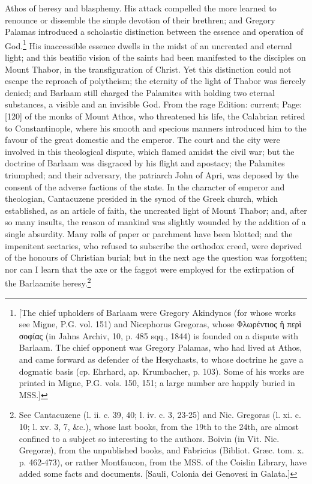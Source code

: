 Athos of heresy and blasphemy. His attack compelled the more learned to renounce or dissemble the simple devotion of their brethren; and Gregory Palamas introduced a scholastic distinction between the essence and operation of God.\footnote{[The chief upholders of Barlaam were Gregory Akindynos (for whose works see Migne, P.G. vol. 151) and Nicephorus Gregoras, whose \textgreek{Φλωρέντιος \texthebrew{ἢ} περ\texthebrew{ὶ} σοφίας} (in Jahns Archiv, 10, p. 485 sqq., 1844) is founded on a dispute with Barlaam. The chief opponent was Gregory Palamas, who had lived at Athos, and came forward as defender of the Hesychasts, to whose doctrine he gave a dogmatic basis (cp. Ehrhard, ap. Krumbacher, p. 103). Some of his works are printed in Migne, P.G. vols. 150, 151; a large number are happily buried in MSS.]} His inaccessible essence dwells in the midst of an uncreated and eternal light; and this beatific vision of the saints had been manifested to the disciples on Mount Thabor, in the transfiguration of Christ. Yet this distinction could not escape the reproach of polytheism; the eternity of the light of Thabor was fiercely denied; and Barlaam still charged the Palamites with holding two eternal substances, a visible and an invisible God. From the rage Edition: current; Page: [120] of the monks of Mount Athos, who threatened his life, the Calabrian retired to Constantinople, where his smooth and specious manners introduced him to the favour of the great domestic and the emperor. The court and the city were involved in this theological dispute, which flamed amidst the civil war; but the doctrine of Barlaam was disgraced by his flight and apostacy; the Palamites triumphed; and their adversary, the patriarch John of Apri, was deposed by the consent of the adverse factions of the state. In the character of emperor and theologian, Cantacuzene presided in the synod of the Greek church, which established, as an article of faith, the uncreated light of Mount Thabor; and, after so many insults, the reason of mankind was slightly wounded by the addition of a single absurdity. Many rolls of paper or parchment have been blotted; and the impenitent sectaries, who refused to subscribe the orthodox creed, were deprived of the honours of Christian burial; but in the next age the question was forgotten; nor can I learn that the axe or the faggot were employed for the extirpation of the Barlaamite heresy.\footnote{See Cantacuzene (l. ii. c. 39, 40; l. iv. c. 3, 23-25) and Nic. Gregoras (l. xi. c. 10; l. xv. 3, 7, \&c.), whose last books, from the 19th to the 24th, are almost confined to a subject so interesting to the authors. Boivin (in Vit. Nic. Gregoræ), from the unpublished books, and Fabricius (Bibliot. Græc. tom. x. p. 462-473), or rather Montfaucon, from the MSS. of the Coislin Library, have added some facts and documents. [Sauli, Colonia dei Genovesi in Galata.]}

